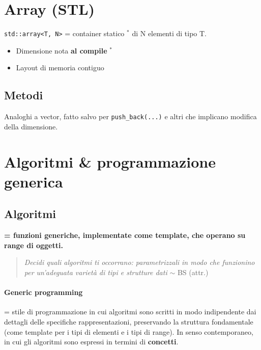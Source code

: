 \documentclass[10pt, oneside]{book}
\begin{document}
\section{Array (STL)}
\texttt{std::array<T, N>} = container statico $\mathbf{^\ast}$ di N elementi di tipo T.
\begin{itemize}
\item Dimensione nota \textbf{al compile} $\mathbf{^\ast}$
\item Layout di memoria contiguo
\end{itemize}

\subsection{Metodi}
Analoghi a vector, fatto salvo per \texttt{push\_back(...)} e altri che implicano modifica della dimensione.

\section{Algoritmi \& programmazione generica}

\subsection{Algoritmi}
\textbf{= funzioni generiche, implementate come template, che operano su range di oggetti.
}
\begin{quote}
\textit{Decidi quali algoritmi ti occorrano:
parametrizzali in modo che funzionino
per un'adeguata varietà di tipi e strutture dati} $\sim$ BS (attr.)
\end{quote}

\paragraph{Generic programming} = stile di programmazione in cui algoritmi sono scritti in modo indipendente dai dettagli delle specifiche rappresentazioni, preservando la struttura fondamentale (come template per i tipi di elementi e i tipi di range). In senso contemporaneo, in cui gli algoritmi sono espressi in termini di \textbf{concetti}.
\end{document}
